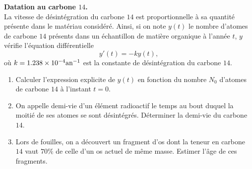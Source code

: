 \documentclass[a4paper, 11pt,reqno]{article}
\begin{document}
\begin{exercice}  \; \textbf{Datation au carbone $14$.}\\
La vitesse de d\'esint\'egration du carbone $14$ est proportionnelle \`a sa quantit\'e pr\'esente dans le mat\'eriau consid\'er\'e. Ainsi, si on note $y(t)$ le nombre d'atomes de carbone $14$ pr\'esents dans un \'echantillon de mati\`ere organique \`a l'ann\'ee $t$, $y$ v\'erifie l'\'equation diff\'erentielle
$$y'(t) = -k y(t),$$
o\`u $k=1.238 \times 10^{-4} \textmd{an}^{-1}$ est la constante de d\'esint\'egration du carbone $14$.
\begin{enumerate}
\item Calculer l'expression explicite de $y(t)$ en fonction du nombre $N_0$ d'atomes de carbone $14$ \`a l'instant $t=0$.
\item On appelle demi-vie d'un \'el\'ement radioactif le temps au bout duquel la moiti\'e de ses atomes se sont d\'esint\'egr\'es. D\'eterminer la demi-vie du carbone $14$.
\item Lors de fouilles, on a d\'ecouvert un fragment d'os dont la teneur en carbone $14$ vaut $70\%$ de celle d'un os actuel de m\^eme masse. Estimer l'\^age de ces fragments.
\end{enumerate}
\end{exercice}
\end{document}
